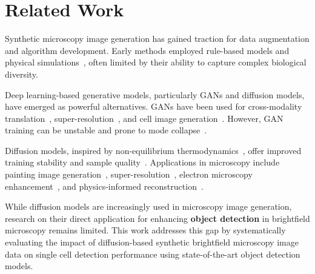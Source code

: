 \section{Related Work}
\label{sec:related-work}
Synthetic microscopy image generation has gained traction for data augmentation and algorithm development.
Early methods employed rule-based models and physical simulations~\cite{david_svoboda_generation_2012,david_svoboda_towards_2013,rajaram_simucell_2012}, often limited by their ability to capture complex biological diversity.

Deep learning-based generative models, particularly GANs and diffusion models, have emerged as powerful alternatives.
GANs have been used for cross-modality translation~\cite{christiansen_silico_2018,gyuhyun_lee_deephcs_2018,gyuhyun_lee_deephcs_2021}, super-resolution~\cite{zhang_high-throughput_2019}, and cell image generation~\cite{marin_scalbert_generic_2019}.
However, GAN training can be unstable and prone to mode collapse~\cite{juan_c_caicedo_evaluation_2019,ricard_durall_combating_2020}.

Diffusion models, inspired by non-equilibrium thermodynamics~\cite{jascha_sohl-dickstein_deep_2015}, offer improved training stability and sample quality~\cite{ho_denoising_2020,song_denoising_2020}.
Applications in microscopy include painting image generation~\cite{cross-zamirski_class-guided_2023}, super-resolution~\cite{gabriel_della_maggiora_conditional_2023}, electron microscopy enhancement~\cite{lu_diffusion-based_2024}, and physics-informed reconstruction~\cite{li_microscopy_2023}.

While diffusion models are increasingly used in microscopy image generation, research on their direct application for enhancing \textbf{object detection} in brightfield microscopy remains limited.
This work addresses this gap by systematically evaluating the impact of diffusion-based synthetic brightfield microscopy image data on single cell detection performance using state-of-the-art object detection models.